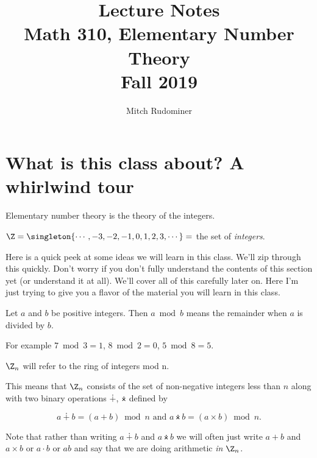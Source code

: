 \documentclass[oneside,12pt]{amsart}
\begin{document}
\title{Lecture Notes \\ Math 310, Elementary Number Theory \\ Fall 2019}
\author{Mitch Rudominer}

\maketitle

\tableofcontents


\section{What is this class about? A whirlwind tour}

Elementary number theory is the theory of the integers.

$\Z = \singleton{\cdots, -3, -2, -1, 0, 1, 2, 3, \cdots} = $ the set of \emph{integers}.

Here is a quick peek at some ideas we will learn in this class. We'll zip through this quickly. Don't
worry if you don't fully understand the contents of this section yet (or understand it at all).
We'll cover all of this carefully later on. Here I'm just trying
to give you a flavor of the material you will learn in this class.

\begin{definition}
\label{ModOperatorTake1}
Let $a$ and $b$ be positive integers. Then $a \bmod b$ means the remainder when $a$ is divided by $b$.
\end{definition}

For example $7\bmod 3 = 1$, $8\bmod 2 = 0$, $5\bmod 8 = 5$.

\begin{definition} $\Z_n$ will refer to the ring of integers mod n. \end{definition}

This means that $\Z_n$ consists of the set of non-negative integers less than $n$ along
with two binary operations $\dotplus$, $\dottimes$ defined by

$$a \dotplus b = (a + b) \bmod n \text{ and } a \dottimes b = (a \times b) \bmod n.$$

Note that rather than writing $a\dotplus b$ and $a\dottimes b$ we will often just write
$a+b$ and $a\times b$ or $a\cdot b$ or $a b$ and say that we are doing arithmetic \emph{in $\Z_n$}.
\end{document}
